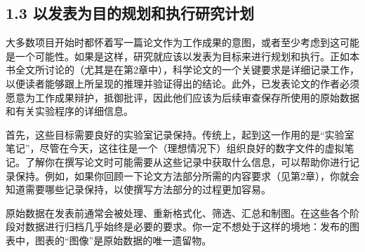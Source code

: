 \subsection*{1.3 以发表为目的规划和执行研究计划}
大多数项目开始时都怀着写一篇论文作为工作成果的意图，或者至少考虑到这可能是一个可能性。如果是这样，研究就应该以发表为目标来进行规划和执行。正如本书全文所讨论的（尤其是在第2章中），科学论文的一个关键要求是详细记录工作，以便读者能够跟上所呈现的推理并验证得出的结论。此外，已发表论文的作者必须愿意为工作成果辩护，抵御批评，因此他们应该为后续审查保存所使用的原始数据和有关实验程序的详细信息。

首先，这些目标需要良好的实验室记录保持。传统上，起到这一作用的是“实验室笔记”，尽管在今天，这往往是一个（理想情况下）组织良好的数字文件的虚拟笔记。了解你在撰写论文时可能需要从这些记录中获取什么信息，可以帮助你进行记录保持。例如，如果你回顾一下论文方法部分所需的内容要求（见第2章），你就会知道需要哪些记录保持，以使撰写方法部分的过程更加容易。

原始数据在发表前通常会被处理、重新格式化、筛选、汇总和制图。在这些各个阶段对数据进行归档几乎始终是必要的要求。你一定不想处于这样的境地：发布的图表中，图表的“图像”是原始数据的唯一遗留物。

